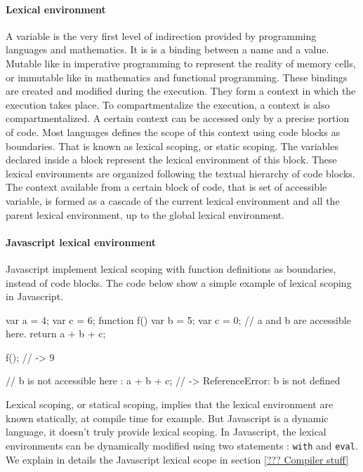 \paragraph{Lexical environment}

A variable is the very first level of indirection provided by programming languages and mathematics.
It is is a binding between a name and a value.
Mutable like in imperative programming to represent the reality of memory cells, or immutable like in mathematics and functional programming.
These bindings are created and modified during the execution.
They form a context in which the execution takes place.
To compartmentalize the execution, a context is also compartmentalized.
A certain context can be accessed only by a precise portion of code.
Most languages defines the scope of this context using code blocks as boundaries.
That is known as lexical scoping, or static scoping.
The variables declared inside a block represent the lexical environment of this block.
These lexical environments are organized following the textual hierarchy of code blocks.
The context available from a certain block of code, that is set of accessible variable, is formed as a cascade of the current lexical environment and all the parent lexical environment, up to the global lexical environment.


\paragraph{Javascript lexical environment}

Javascript implement lexical scoping with function definitions as boundaries, instead of code blocks.
The code below show a simple example of lexical scoping in Javascript.

\begin{code}
  var a = 4;
  var c = 6;
  function f() {
    var b = 5;
    var c = 0;
    // a and b are accessible here.
    return a + b + c;
  }

  f(); // -> 9

  // b is not accessible here :
  a + b + c; // -> ReferenceError: b is not defined
\end{code}

Lexical scoping, or statical scoping, implies that the lexical environment are known statically, at compile time for example.
But Javascript is a dynamic language, it doesn't truly provide lexical scoping.
In Javascript, the lexical environments can be dynamically modified using two statements : \texttt{with} and \texttt{eval}.
We explain in details the Javascript lexical scope in section \ref{??? Compiler stuff}

